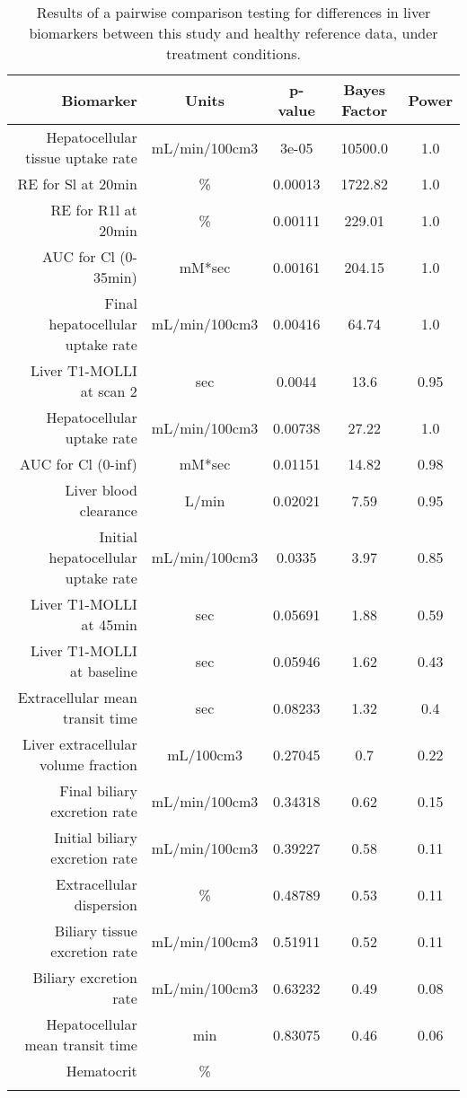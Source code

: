 \documentclass{epflreport}%
\begin{document}
%
\begin{longtable}{rcccc}%
\hline%
Biomarker&Units&p{-}value&Bayes Factor&Power\\%
\hline%
Hepatocellular tissue uptake rate&mL/min/100cm3&3e{-}05&10500.0&1.0\\%
RE for Sl at 20min&\%&0.00013&1722.82&1.0\\%
RE for R1l at 20min&\%&0.00111&229.01&1.0\\%
AUC for Cl (0{-}35min)&mM*sec&0.00161&204.15&1.0\\%
Final hepatocellular uptake rate&mL/min/100cm3&0.00416&64.74&1.0\\%
Liver T1{-}MOLLI at scan 2&sec&0.0044&13.6&0.95\\%
Hepatocellular uptake rate&mL/min/100cm3&0.00738&27.22&1.0\\%
AUC for Cl (0{-}inf)&mM*sec&0.01151&14.82&0.98\\%
Liver blood clearance&L/min&0.02021&7.59&0.95\\%
Initial hepatocellular uptake rate&mL/min/100cm3&0.0335&3.97&0.85\\%
Liver T1{-}MOLLI at 45min&sec&0.05691&1.88&0.59\\%
Liver T1{-}MOLLI at baseline&sec&0.05946&1.62&0.43\\%
Extracellular mean transit time&sec&0.08233&1.32&0.4\\%
Liver extracellular volume fraction&mL/100cm3&0.27045&0.7&0.22\\%
Final biliary excretion rate&mL/min/100cm3&0.34318&0.62&0.15\\%
Initial biliary excretion rate&mL/min/100cm3&0.39227&0.58&0.11\\%
Extracellular dispersion&\%&0.48789&0.53&0.11\\%
Biliary tissue excretion rate&mL/min/100cm3&0.51911&0.52&0.11\\%
Biliary excretion rate&mL/min/100cm3&0.63232&0.49&0.08\\%
Hepatocellular mean transit time&min&0.83075&0.46&0.06\\%
Hematocrit&\%&&&\\%
\hline%
\caption{Results of a pairwise comparison testing for differences in liver biomarkers between this study and healthy reference data, under treatment conditions.} \\%
\end{longtable}%
\end{document}

